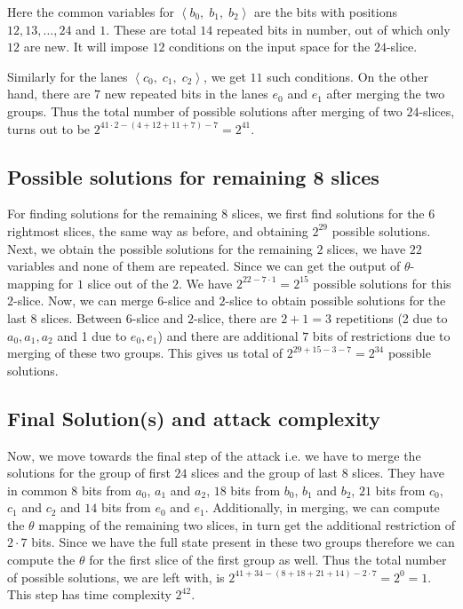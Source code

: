 Here the common variables for $\left< b_0,\; b_1,\; b_2\right>$ are the bits with positions
$12, 13,\ldots, 24$ and $1$. These are total $14$ repeated bits in number, out of which only $12$ are new. It will impose $12$ conditions on the input space for the $24$-slice.

Similarly for the lanes $\left< c_0,\; c_1,\;c_2 \right>$, we get $11$ such conditions.
On the other hand, there are $7$ new repeated bits in the lanes $e_0$ and $e_1$ after merging the two groups. Thus the total number of possible solutions after merging of two $24$-slices, turns out to be $2^{41\cdot 2 - (4 + 12 + 11 + 7) - 7 } = 2^{41}$.

\subsection{Possible solutions for remaining 8 slices} 
For finding solutions for the remaining $8$ slices, we first find solutions for the $6$ rightmost slices, the same way as before, and obtaining $2^{29}$ possible solutions. 
Next, we obtain the possible solutions for the remaining $2$ slices, we have $22$ variables and none of them are repeated. Since we can get the output of $\theta$-mapping for $1$ slice out of the $2$. We have  $2^{22 - 7\cdot 1} = 2^{15}$ possible solutions for this $2$-slice.
Now, we can merge $6$-slice and $2$-slice to obtain possible solutions for the last $8$ slices. Between $6$-slice and $2$-slice, there are $2 + 1 = 3$ repetitions (2 due to $a_0,a_1,a_2$ and 1 due to $e_0, e_1$) and there are additional $7$ bits of restrictions due to merging of these two groups. This gives us total of $2^{29 + 15 - 3 -7} = 2^{34}$ possible solutions.

\subsection{Final Solution(s) and attack complexity}
Now, we move towards the final step of the attack i.e. we have to merge the solutions for the group of first $24$ slices and the group of last $8$ slices. They have in common $8$ bits from $a_0$, $a_1$ and  $a_2$, $18$ bits from $b_0$, $b_1$ and $b_2$, $21$ bits from $c_0$, $c_1$ and $c_2$ and $14$ bits from $e_0$ and $e_1$. Additionally, in merging, we can compute the $\theta$ mapping of the remaining two slices, in turn get the additional restriction of $2\cdot 7$ bits. Since we have the full state present in these two groups therefore we can compute the $\theta$ for the first slice of the first group as well. Thus the total number of possible solutions, we are left with, is $2^{41 + 34 - (8 + 18 + 21 + 14) - 2 \cdot 7} = 2^{0} = 1$. This step has time complexity $ 2^{42}$.

